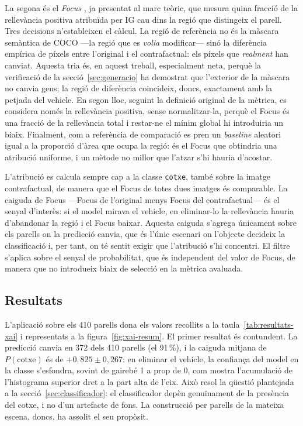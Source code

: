 La segona és el \emph{Focus} \cite{ariasduart2022}, ja presentat al marc teòric, que mesura quina fracció de la rellevància positiva atribuïda per \ac{IG} cau dins la regió que distingeix el parell. Tres decisions n'estableixen el càlcul. La regió de referència no és la màscara semàntica de \ac{COCO} —la regió que es \emph{volia} modificar— sinó la diferència empírica de píxels entre l'original i el contrafactual: els píxels que \emph{realment} han canviat. Aquesta tria és, en aquest treball, especialment neta, perquè la verificació de la secció~\ref{sec:generacio} ha demostrat que l'exterior de la màscara no canvia gens; la regió de diferència coincideix, doncs, exactament amb la petjada del vehicle. En segon lloc, seguint la definició original de la mètrica, es considera només la rellevància positiva, sense normalitzar-la, perquè el Focus és una fracció de la rellevància total i restar-ne el mínim global hi introduiria un biaix. Finalment, com a referència de comparació es pren un \emph{baseline} aleatori igual a la proporció d'àrea que ocupa la regió: és el Focus que obtindria una atribució uniforme, i un mètode no millor que l'atzar s'hi hauria d'acostar.

L'atribució es calcula sempre cap a la classe \texttt{cotxe}, també sobre la imatge contrafactual, de manera que el Focus de totes dues imatges és comparable. La caiguda de Focus —Focus de l'original menys Focus del contrafactual— és el senyal d'interès: si el model mirava el vehicle, en eliminar-lo la rellevància hauria d'abandonar la regió i el Focus baixar. Aquesta caiguda s'agrega únicament sobre els parells on la predicció canvia, que és l'únic escenari on l'objecte decideix la classificació i, per tant, on té sentit exigir que l'atribució s'hi concentri. El filtre s'aplica sobre el senyal de probabilitat, que és independent del valor de Focus, de manera que no introdueix biaix de selecció en la mètrica avaluada.

\subsection{Resultats}
L'aplicació sobre els 410 parells dona els valors recollits a la taula~\ref{tab:resultats-xai} i representats a la figura~\ref{fig:xai-resum}. El primer resultat és contundent. La predicció canvia en 372 dels 410 parells (el 91\,\%), i la caiguda mitjana de $P(\text{cotxe})$ és de $+0{,}825 \pm 0{,}267$: en eliminar el vehicle, la confiança del model en la classe s'esfondra, sovint de gairebé 1 a prop de 0, com mostra l'acumulació de l'histograma superior dret a la part alta de l'eix. Això resol la qüestió plantejada a la secció~\ref{sec:classificador}: el classificador depèn genuïnament de la presència del cotxe, i no d'un artefacte de fons. La construcció per parells de la mateixa escena, doncs, ha assolit el seu propòsit.

